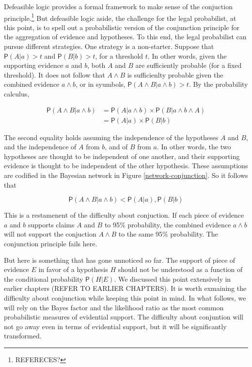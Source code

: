 \documentclass[10pt,dvipsnames,enabledeprecatedfontcommands]{scrartcl}
\newcommand{\et}{\wedge}
\newcommand{\pr}[1]{\mathsf{P}(#1)}
\begin{document}
Defeasible logic provides a formal framework to make sense of the
conjuction principle.\footnote{REFERECES?} But defeasible logic aside,
the challenge for the legal probabilist, at this point, is to spell out
a probabilistic version of the conjunction principle for the aggregation
of evidence and hypotheses. To this end, the legal probabilist can
pursue different strategies. One strategy is a non-starter. Suppose that
\(\pr{A | a}>t\) and \(\pr{B | b}>t\), for a threshold \(t\). In other
words, given the supporting evidence \(a\) and \(b\), both \(A\) and
\(B\) are sufficiently probable (for a fixed threshold). It does not
follow that \(A \et B\) is sufficienlty probable given the combined
evidence \(a\et b\), or in syumbols, \(\pr{A \wedge B | a \wedge b}>t\).
By the probability calculus,

\begin{align*}
\pr{A \wedge  B | a \wedge b}& =\pr{A |a \wedge b} \times \pr{B | a \wedge b \wedge A}\\
 & = \pr{A |a} \times \pr{B | b}
 \end{align*}

The second equality holds assuming the independence of the hypotheses
\(A\) and \(B\), and the independence of \(A\) from \(b\), and of \(B\)
from \(a\). In other words, the two hypotheses are thought to be
independent of one another, and their supporting evidence is thought to
be independent of the other hypothesis. These assumptions are codified
in the Bayesian network in Figure \ref{network-conjunction}. So it
follows that

\[\pr{A \wedge B | a \wedge b}< \pr{A | a}, \pr{B | b}  \]

\noindent This is a restamenent of the difficulty about conjuction. If
each piece of evidence \(a\) and \(b\) supports claims \(A\) and \(B\)
to 95\% probability, the combined evidence \(a\et b\) will not support
the conjuction \(A\et B\) to the same 95\% probability. The conjunction
principle fails here.

But here is something that has gone unnoticed so far. The support of
piece of evidence \(E\) in favor of a hypothesis \(H\) should not be
understood as a function of the conditional probability \(\pr{H | E}\).
We discussed this point extensively in earlier chapters (REFER TO
EARLIER CHAPTERS). It is worth exmaining the difficulty about
conjunction while keeping this point in mind. In what follows, we will
rely on the Bayes factor and the likelihood ratio as the most common
probabilistic measures of evidential support. The difficulty about
conjuntion will not go away even in terms of evidential support, but it
will be significantly transformed.
\end{document}
